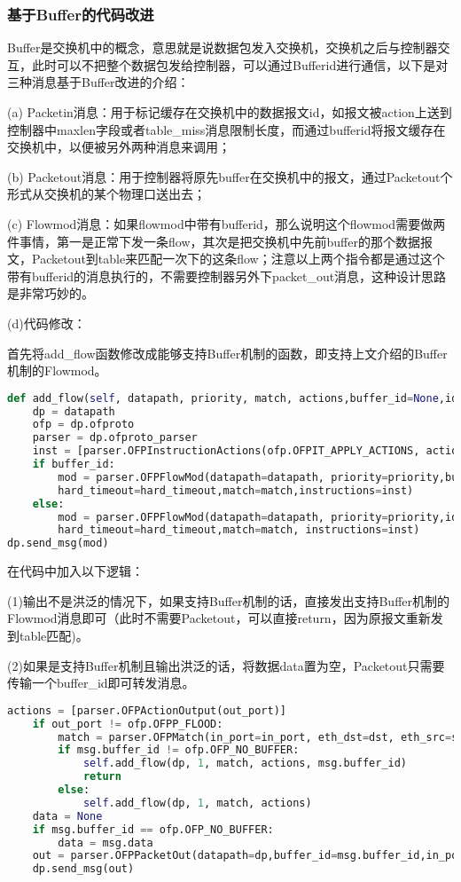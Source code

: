 \documentclass{xjtureport}
\begin{document}
\subsubsection{基于Buffer的代码改进}
Buffer是交换机中的概念，意思就是说数据包发入交换机，交换机之后与控制器交互，此时可以不把整个数据包发给控制器，可以通过Bufferid进行通信，以下是对三种消息基于Buffer改进的介绍：\par 
(a)  Packetin消息：用于标记缓存在交换机中的数据报文id，如报文被action上送到控制器中maxlen字段或者table\_miss消息限制长度，而通过bufferid将报文缓存在交换机中，以便被另外两种消息来调用；\par
(b)  Packetout消息：用于控制器将原先buffer在交换机中的报文，通过Packetout个形式从交换机的某个物理口送出去；\par
(c)  Flowmod消息：如果flowmod中带有bufferid，那么说明这个flowmod需要做两件事情，第一是正常下发一条flow，其次是把交换机中先前buffer的那个数据报文，Packetout到table来匹配一次下的这条flow；注意以上两个指令都是通过这个带有bufferid的消息执行的，不需要控制器另外下packet\_out消息，这种设计思路是非常巧妙的。\par  
(d)代码修改：\par
首先将add\_flow函数修改成能够支持Buffer机制的函数，即支持上文介绍的Buffer机制的Flowmod。
\begin{lstlisting}[language=Python]	
def add_flow(self, datapath, priority, match, actions,buffer_id=None,idle_timeout=0,hard_timeout=0):
	dp = datapath 
	ofp = dp.ofproto 
	parser = dp.ofproto_parser 
	inst = [parser.OFPInstructionActions(ofp.OFPIT_APPLY_ACTIONS, actions)] 
	if buffer_id: 
		mod = parser.OFPFlowMod(datapath=datapath, priority=priority,buffer_id=buffer_id,idle_timeout=idle_timeout,
		hard_timeout=hard_timeout,match=match,instructions=inst)
	else:
		mod = parser.OFPFlowMod(datapath=datapath, priority=priority,idle_timeout=idle_timeout,
		hard_timeout=hard_timeout,match=match, instructions=inst)
dp.send_msg(mod) 
\end{lstlisting}
在代码中加入以下逻辑：\par
(1)输出不是洪泛的情况下，如果支持Buffer机制的话，直接发出支持Buffer机制的Flowmod消息即可（此时不需要Packetout，可以直接return，因为原报文重新发到table匹配)。\par
(2)如果是支持Buffer机制且输出洪泛的话，将数据data置为空，Packetout只需要传输一个buffer\_id即可转发消息。\par
\begin{lstlisting}[language=Python]
    actions = [parser.OFPActionOutput(out_port)]
	if out_port != ofp.OFPP_FLOOD:
		match = parser.OFPMatch(in_port=in_port, eth_dst=dst, eth_src=src)
		if msg.buffer_id != ofp.OFP_NO_BUFFER:
			self.add_flow(dp, 1, match, actions, msg.buffer_id)
			return
		else:
			self.add_flow(dp, 1, match, actions)
	data = None
	if msg.buffer_id == ofp.OFP_NO_BUFFER:
		data = msg.data
	out = parser.OFPPacketOut(datapath=dp,buffer_id=msg.buffer_id,in_port=in_port, actions=actions, data=data)
	dp.send_msg(out)
\end{lstlisting}
\end{document}
